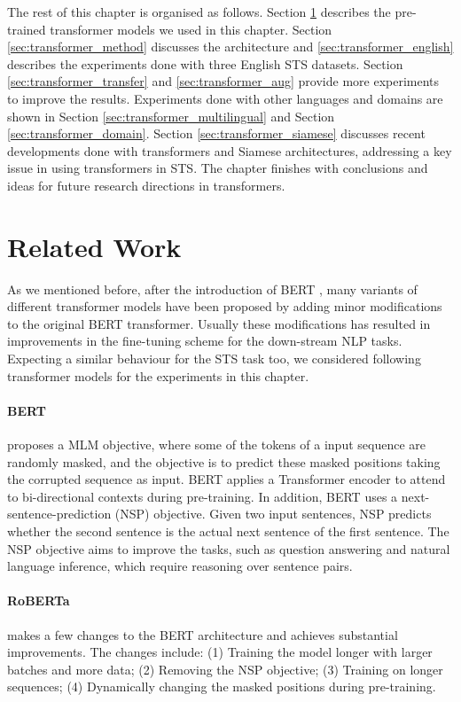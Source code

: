 The rest of this chapter is organised as follows. Section \ref{sec:transformers_related} describes the pre-trained transformer models we used in this chapter. Section \ref{sec:transformer_method} discusses the architecture and \ref{sec:transformer_english} describes the experiments done with three English STS datasets. Section \ref{sec:transformer_transfer} and \ref{sec:transformer_aug} provide more experiments to improve the results. Experiments done with other languages and domains are shown in Section \ref{sec:transformer_multilingual} and Section \ref{sec:transformer_domain}. Section \ref{sec:transformer_siamese} discusses recent developments done with transformers and Siamese architectures, addressing a key issue in using transformers in STS. The chapter finishes with conclusions and ideas for future research directions in transformers. 

\section{Related Work}
\label{sec:transformers_related}
As we mentioned before, after the introduction of BERT \autocite{devlin-etal-2019-bert}, many variants of different transformer models have been proposed by adding minor modifications to the original BERT transformer. Usually these modifications has resulted in improvements in the fine-tuning scheme for the down-stream NLP tasks. Expecting a similar behaviour for the STS task too, we considered following transformer models for the experiments in this chapter.

\paragraph{BERT} \autocite{devlin-etal-2019-bert} proposes a MLM objective, where some of the tokens of a input sequence are randomly masked, and the objective is to predict these masked positions taking the corrupted sequence as input. BERT applies a Transformer encoder to attend to bi-directional contexts during pre-training. In addition, BERT uses a next-sentence-prediction (NSP) objective. Given two input sentences, NSP predicts whether the second sentence is the actual next sentence of the first sentence. The NSP objective aims to improve the tasks, such as question answering and natural language inference, which require reasoning over sentence pairs. 

\paragraph{RoBERTa} \autocite{liu2019roberta} makes a few changes to the BERT architecture and achieves substantial improvements. The changes include: (1) Training the model longer with larger batches and more data; (2) Removing the NSP objective; (3) Training on longer sequences; (4) Dynamically changing the masked positions during pre-training.

